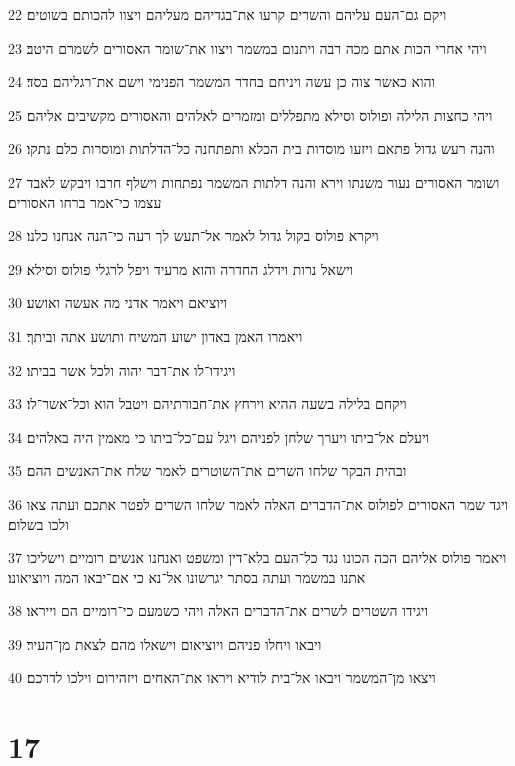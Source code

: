 \par 22 ויקם גם־העם עליהם והשרים קרעו את־בגדיהם מעליהם ויצוו להכותם בשוטים׃
\par 23 ויהי אחרי הכות אתם מכה רבה ויתנום במשמר ויצוו את־שומר האסורים לשמרם היטב׃
\par 24 והוא כאשר צוה כן עשה ויניחם בחדר המשמר הפנימי וישם את־רגליהם בסד׃
\par 25 ויהי כחצות הלילה ופולוס וסילא מתפללים ומזמרים לאלהים והאסורים מקשיבים אליהם׃
\par 26 והנה רעש גדול פתאם ויזעו מוסדות בית הכלא ותפתחנה כל־הדלתות ומוסרות כלם נתקו׃
\par 27 ושומר האסורים נעור משנתו וירא והנה דלתות המשמר נפתחות וישלף חרבו ויבקש לאבד עצמו כי־אמר ברחו האסורים׃
\par 28 ויקרא פולוס בקול גדול לאמר אל־תעש לך רעה כי־הנה אנחנו כלנו׃
\par 29 וישאל נרות וידלג החדרה והוא מרעיד ויפל לרגלי פולוס וסילא׃
\par 30 ויוציאם ויאמר אדני מה אעשה ואושע׃
\par 31 ויאמרו האמן באדון ישוע המשיח ותושע אתה וביתך׃
\par 32 ויגידו־לו את־דבר יהוה ולכל אשר בביתו׃
\par 33 ויקחם בלילה בשעה ההיא וירחץ את־חבורתיהם ויטבל הוא וכל־אשר־לו׃
\par 34 ויעלם אל־ביתו ויערך שלחן לפניהם ויגל עם־כל־ביתו כי מאמין היה באלהים׃
\par 35 ובהית הבקר שלחו השרים את־השוטרים לאמר שלח את־האנשים ההם׃
\par 36 ויגד שמר האסורים לפולוס את־הדברים האלה לאמר שלחו השרים לפטר אתכם ועתה צאו ולכו בשלום׃
\par 37 ויאמר פולוס אליהם הכה הכונו נגד כל־העם בלא־דין ומשפט ואנחנו אנשים רומיים וישליכו אתנו במשמר ועתה בסתר יגרשונו אל־נא כי אם־יבאו המה ויוציאונו׃
\par 38 ויגידו השטרים לשרים את־הדברים האלה ויהי כשמעם כי־רומיים הם וייראו׃
\par 39 ויבאו ויחלו פניהם ויוציאום וישאלו מהם לצאת מן־העיר׃
\par 40 ויצאו מן־המשמר ויבאו אל־בית לודיא ויראו את־האחים ויזהירום וילכו לדרכם׃

\chapter{17}

